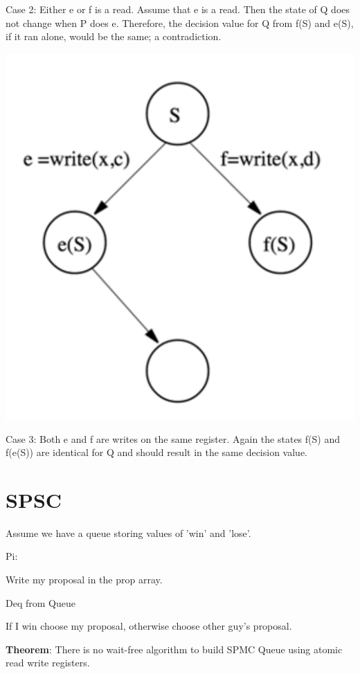 \documentclass[twoside]{article}
\begin{document}
Case 2: Either e or f is a read. Assume that e is a read. Then the state of Q does not change when P does e. Therefore, the decision value for Q from f(S) and e(S), if it ran alone, would be the same; a contradiction.

\centerline{\includegraphics{case3.png}}

Case 3: Both e and f are writes on the same register. Again the states f(S) and f(e(S)) are identical for Q and should result in the same decision value.

\section{SPSC}

Assume we have a queue storing values of 'win' and 'lose'.

Pi:

\hspace{10mm} Write my proposal in the prop array.
    
\hspace{10mm} Deq from Queue 
    
\hspace{10mm} If I win choose my proposal, otherwise choose other guy’s proposal.
    

\textbf{Theorem}: There is no wait-free algorithm to build SPMC Queue using atomic read write registers.
\end{document}
